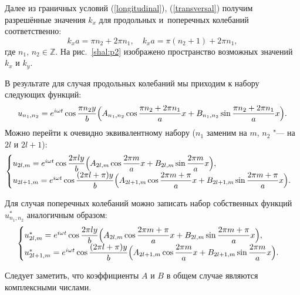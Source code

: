 Далее из граничных условий (\ref{longitudinal}), (\ref{transversal}) получим разрешённые значения $k_x$ для продольных и~поперечных колебаний соответственно:
$$
k_x a=\pi n_2+2\pi n_1,\quad
k_x a=\pi (n_2+1)+2\pi n_1,
$$
где $n_1$, $n_2\in{\mathbb  Z}$.
На рис.~\ref{shal:p2} изображено пространство возможных значений $k_x$ и $k_y$.

В результате для случая продольных колебаний мы приходим к набору следующих функций:
$$
u_{n_1,n_2}=e^{i\omega t}\cos \dfrac{\pi n_2 y}{b}\Bigl(A_{n_1,n_2}\cos \dfrac{\pi n_2+2\pi n_1}{a} x+B_{n_1,n_2}\sin \dfrac{\pi n_2+2\pi n_1}{a} x\Bigr).
$$
Можно перейти к очевидно эквивалентному набору ($n_1$ заменим на $m$, $n_2$ "--- на $2l$ и $2l+1$):
\begin{align}
\begin{cases}
u_{2l,m}=e^{i\omega t}\cos \dfrac{2\pi l y}{b}\Bigl(A_{2l,m}\cos \dfrac{2\pi m}{a} x+B_{2l,m}\sin \dfrac{2\pi m}{a} x\Bigr),\\
u_{2l+1,m}=e^{i\omega t}\cos \dfrac{(2\pi l+\pi) y}{b}\Bigl(A_{2l+1,m}\cos \dfrac{2\pi m+\pi}{a}x+B_{2l+1,m}\sin \dfrac{2\pi m+\pi}{a} x\Bigr).\nonumber
\end{cases}
\end{align}

Для случая поперечных колебаний можно записать набор собственных функций $u^*_{n_1,n_2}$ аналогичным образом:
\begin{align}
\begin{cases}
u^*_{2l,m}=e^{i\omega t}\cos \dfrac{2\pi l y}{b}\Bigl(A_{2l,m}\cos \dfrac{2\pi m+\pi}{a} x+B_{2l,m}\sin \dfrac{2\pi m+\pi}{a} x\Bigr),\\
u^*_{2l+1,m}=e^{i\omega t}\cos \dfrac{(2\pi l+\pi) y}{b}\Bigl(A_{2l+1,m}\cos \dfrac{2\pi m}{a} x+B_{2l+1,m}\sin \dfrac{2\pi m}{a} x\Bigr).\nonumber
\end{cases}
\end{align}

Следует заметить, что коэффициенты $A$ и $B$ в общем случае являются комплексными числами.

